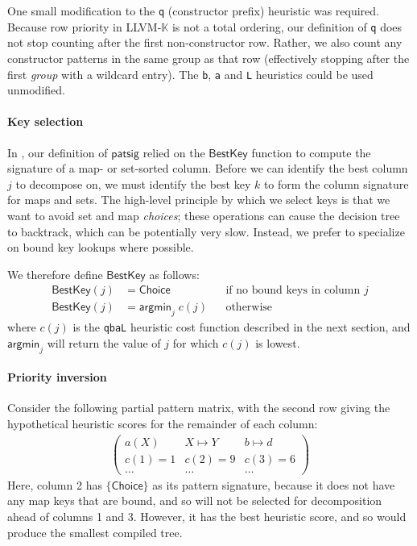 \documentclass{article}
\theoremstyle{definition}
\newcommand{\K}{$\mathbb{K}$\xspace}
\newcommand{\KL}{LLVM-\K}
\newcommand{\mapchoice}{\mathsf{Choice}}
\newcommand{\bestkey}{\mathsf{BestKey}}
\newcommand{\patsig}{\mathsf{patsig}}
\begin{document}
One small modification to the \texttt{q} (constructor prefix) heuristic was
required. Because row priority in \KL is not a total ordering, our definition of
\texttt{q} does not stop counting after the first non-constructor row. Rather,
we also count any constructor patterns in the same group as that row
(effectively stopping after the first \emph{group} with a wildcard entry). The
\texttt{b}, \texttt{a} and \texttt{L} heuristics could be used unmodified.


\paragraph{Key selection\\}

In , our definition of $ \patsig $ relied on the $
\bestkey $ function to compute the signature of a map- or set-sorted column.
Before we can identify the best column $ j $ to decompose on, we must identify
the best key $ k $ to form the column signature for maps and sets.
The high-level principle by which we select keys is that we want to avoid set
and map \emph{choices}; these operations can cause the decision tree to
backtrack, which can be potentially very slow. Instead, we prefer to specialize
on bound key lookups where possible.

We therefore define $ \bestkey $ as follows:
\begin{align*}
  \bestkey(j) & = \mapchoice && \text{if no bound keys in column } j \\
  \bestkey(j) & = \mathsf{argmin}_j \; c(j) && \text{otherwise}
\end{align*}
where $ c(j) $ is the \texttt{qbaL} heuristic cost function described in the
next section, and $ \mathsf{argmin}_j $ will return the value of $ j $ for which
$ c(j) $ is lowest.











\paragraph{Priority inversion\\}

Consider the following partial pattern matrix, with the second row giving the
hypothetical heuristic scores for the remainder of each column:
\begin{align*}
  \begin{pmatrix}
    a(X) & X \mapsto Y & b \mapsto d \\
    c(1) = 1 & c(2) = 9 & c(3) = 6 \\
    \dots & \dots & \dots
  \end{pmatrix}
\end{align*}
Here, column 2 has $ \{ \mapchoice \} $ as its pattern signature, because it
does not have any map keys that are bound, and so will not be selected for
decomposition ahead of columns 1 and 3.  However, it has the best heuristic
score, and so would produce the smallest compiled tree.
\end{document}
